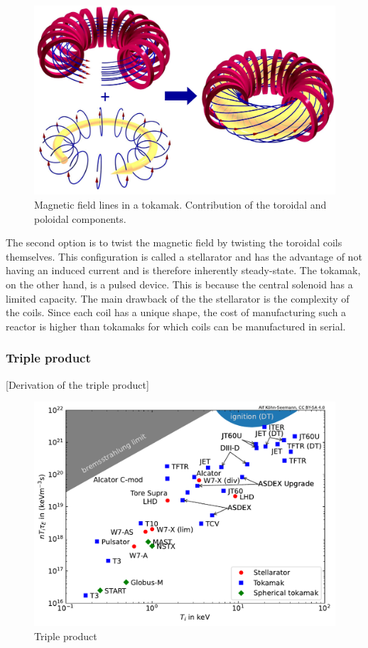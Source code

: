\begin{figure}
    \includegraphics[width=\linewidth]{Figures/Chapter1/tokamak_magnetic_fields.png}
    \caption{Magnetic field lines in a tokamak. Contribution of the toroidal and poloidal components.}
    \label{fig:tokamak magnetic field}
\end{figure}

The second option is to twist the magnetic field by twisting the toroidal coils themselves.
This configuration is called a stellarator and has the advantage of not having an induced current and is therefore inherently steady-state.
The tokamak, on the other hand, is a pulsed device.
This is because the central solenoid has a limited capacity.
The main drawback of the the stellarator is the complexity of the coils.
Since each coil has a unique shape, the cost of manufacturing such a reactor is higher than tokamaks for which coils can be manufactured in serial.

\subsubsection{Triple product}


[Derivation of the triple product]


\begin{figure}
    \centering
    \includegraphics[width=\linewidth]{Figures/Chapter1/triple_product_vs_T.pdf}
    \caption{Triple product}
\end{figure}


